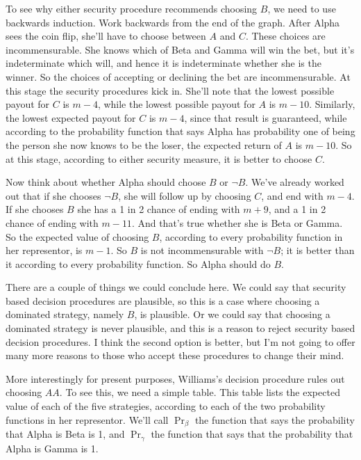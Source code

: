To see why either security procedure recommends choosing $B$, we need to use backwards induction. Work backwards from the end of the graph. After Alpha sees the coin flip, she'll have to choose between $A$ and $C$. These choices are incommensurable. She knows which of Beta and Gamma will win the bet, but it's indeterminate which will, and hence it is indeterminate whether she is the winner. So the choices of accepting or declining the bet are incommensurable. At this stage the security procedures kick in. She'll note that the lowest possible payout for $C$ is $m - 4$, while the lowest possible payout for $A$ is $m - 10$. Similarly, the lowest expected payout for $C$ is $m - 4$, since that result is guaranteed, while according to the probability function that says Alpha has probability one of being the person she now knows to be the loser, the expected return of $A$ is $m - 10$. So at this stage, according to either security measure, it is better to choose $C$.

Now think about whether Alpha should choose $B$ or $\neg B$. We've already worked out that if she chooses $\neg B$, she will follow up by choosing $C$, and end with $m - 4$. If she chooses $B$ she has a 1 in 2 chance of ending with $m + 9$, and a 1 in 2 chance of ending with $m - 11$. And that's true whether she is Beta or Gamma. So the expected value of choosing $B$, according to every probability function in her representor, is $m - 1$. So $B$ is not incommensurable with $\neg B$; it is better than it according to every probability function. So Alpha should do $B$.

There are a couple of things we could conclude here. We could say that security based decision procedures are plausible, so this is a case where choosing a dominated strategy, namely $B$, is plausible. Or we could say that choosing a dominated strategy is never plausible, and this is a reason to reject security based decision procedures. I think the second option is better, but I'm not going to offer many more reasons to those who accept these procedures to change their mind.

More interestingly for present purposes, Williams's decision procedure rules out choosing $AA$. To see this, we need a simple table. This table lists the expected value of each of the five strategies, according to each of the two probability functions in her representor. We'll call $\Pr_\beta$ the function that says the probability that Alpha is Beta is 1, and $\Pr_\gamma$ the function that says that the probability that Alpha is Gamma is 1.

